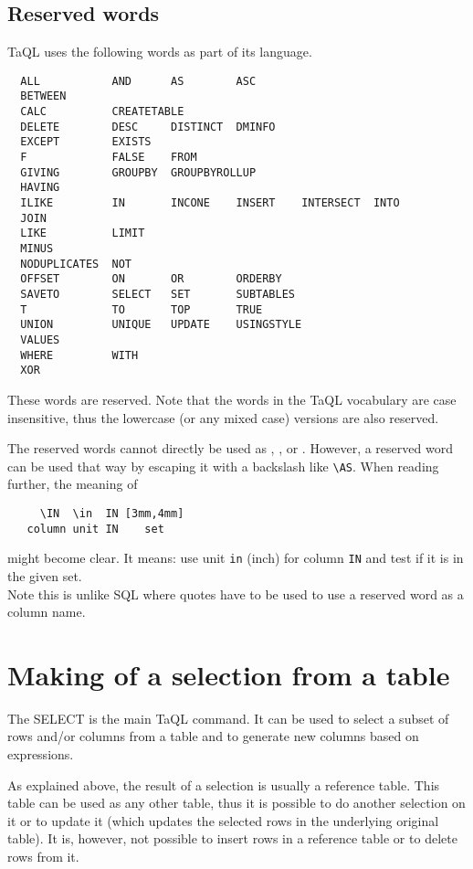\subsection{\label{TAQL:RESERVEDWORDS}Reserved words}
TaQL uses the following words as part of its language.
\begin{verbatim}
  ALL           AND      AS        ASC
  BETWEEN 
  CALC          CREATETABLE
  DELETE        DESC     DISTINCT  DMINFO
  EXCEPT        EXISTS
  F             FALSE    FROM
  GIVING        GROUPBY  GROUPBYROLLUP
  HAVING
  ILIKE         IN       INCONE    INSERT    INTERSECT  INTO
  JOIN
  LIKE          LIMIT
  MINUS
  NODUPLICATES  NOT
  OFFSET        ON       OR        ORDERBY
  SAVETO        SELECT   SET       SUBTABLES
  T             TO       TOP       TRUE
  UNION         UNIQUE   UPDATE    USINGSTYLE
  VALUES 
  WHERE         WITH
  XOR
\end{verbatim}
These words are reserved. Note that the words in the TaQL vocabulary
are case insensitive, 
thus the lowercase (or any mixed case) versions are also reserved.

The reserved words cannot directly be used as
,
, or 
.
However, a reserved word can be used that way by escaping it with a backslash like
\verb+\+\texttt{AS}. When reading further, the meaning of
\begin{verbatim}
     \IN  \in  IN [3mm,4mm]
   column unit IN    set
\end{verbatim}
might become clear. It means: use unit \texttt{in} (inch) for column
\texttt{IN} and test if it is in the given set. 
\\Note this is unlike SQL where quotes have to be used to use a
reserved word as a column name.

\section{Making of a selection from a table}
The SELECT is the main TaQL command. It can be used to select a subset
of rows and/or columns from a table and to generate new columns based
on expressions.

As explained above, the result of a selection is usually a reference
table. This table can be used as any other table, thus it is possible
to do another selection on it or to update it (which updates the
selected rows in the underlying original table). It is, however, not possible to insert
rows in a reference table or to delete rows from it.

